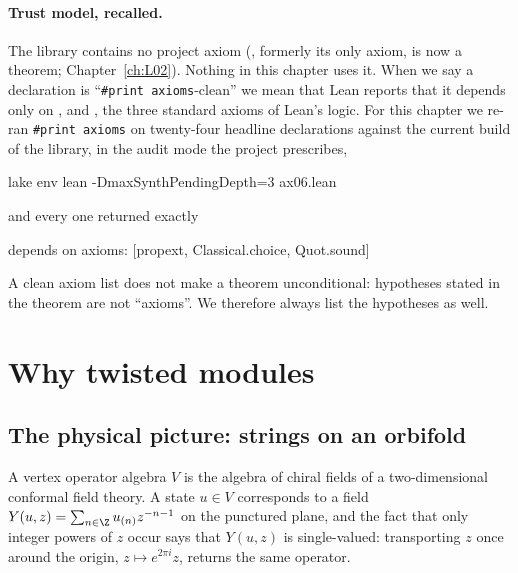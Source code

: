 \paragraph{Trust model, recalled.}  The library contains no project
axiom (, formerly its only axiom, is now a theorem; Chapter~\ref{ch:L02}).  Nothing in
this chapter uses it.  When we say a declaration
is ``\texttt{\#print axioms}-clean'' we mean that Lean reports that it depends only on
,  and , the three standard axioms of Lean's
logic.  For this chapter we re-ran \texttt{\#print axioms} on twenty-four headline declarations
against the current build of the library, in the audit mode the project prescribes,
\begin{plaincode}
lake env lean -DmaxSynthPendingDepth=3 ax06.lean
\end{plaincode}
and every one returned exactly
\begin{plaincode}
depends on axioms: [propext, Classical.choice, Quot.sound]
\end{plaincode}
A clean axiom list does not make a theorem unconditional: hypotheses stated in the theorem are not
``axioms''.  We therefore always list the hypotheses as well.

\section{Why twisted modules}\label{ch06:sec:why}

\subsection{The physical picture: strings on an orbifold}

A vertex operator algebra $V$ is the algebra of chiral fields of a two-dimensional conformal field
theory.  A state $u\in V$ corresponds to a field $Y(u,z)=\sum_{n\in\Z}u_{(n)}z^{-n-1}$ on the
punctured plane, and the fact that only integer powers of $z$ occur says that $Y(u,z)$ is
single-valued: transporting $z$ once around the origin, $z\mapsto e^{2\pi i}z$, returns the same
operator.


